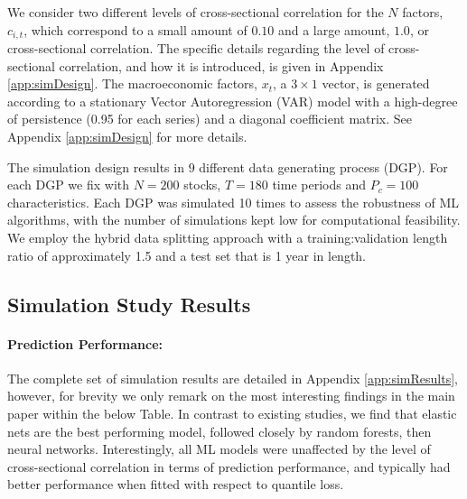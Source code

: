 \documentclass{article}
\begin{document}
We consider two different levels of cross-sectional correlation for the $N$ factors, $c_{i,t}$, which correspond to a small amount of $0.10$ and a large amount, $1.0$, or cross-sectional correlation. The specific details regarding the level of cross-sectional correlation, and how it is introduced, is given in Appendix \ref{app:simDesign}. The macroeconomic factors, $x_t$, a $3 \times 1$ vector, is generated according to a stationary Vector Autoregression (VAR) model with a high-degree of persistence (0.95 for each series) and a diagonal coefficient matrix. See Appendix \ref{app:simDesign} for more details.  

The simulation design results in $9$ different data generating process (DGP). For each DGP we fix with $N = 200$ stocks, $T = 180$ time periods and $P_c = 100$ characteristics. Each DGP was simulated 10 times to assess the robustness of ML algorithms, with the number of simulations kept low for computational feasibility. We employ the hybrid data splitting approach with a training:validation length ratio of approximately 1.5 and a test set that is 1 year in length. 


\subsection{Simulation Study Results}\label{sec:sims} 

\paragraph{Prediction Performance:}
The complete set of simulation results are detailed in Appendix \ref{app:simResults}, however, for brevity we only remark on the most interesting findings in the main paper within the below Table. In contrast to existing studies, we find that elastic nets are the best performing model, followed closely by random forests, then neural networks. Interestingly, all ML models were unaffected by the level of cross-sectional correlation in terms of prediction performance, and typically had better performance when fitted with respect to quantile loss. %
\end{document}
